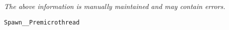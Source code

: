 \label{pkg:spawn\_\_premicrothread}

{\tiny \it The above information is manually maintained and may contain errors.}
\begin{verbatim}
Spawn__Premicrothread
\end{verbatim}

